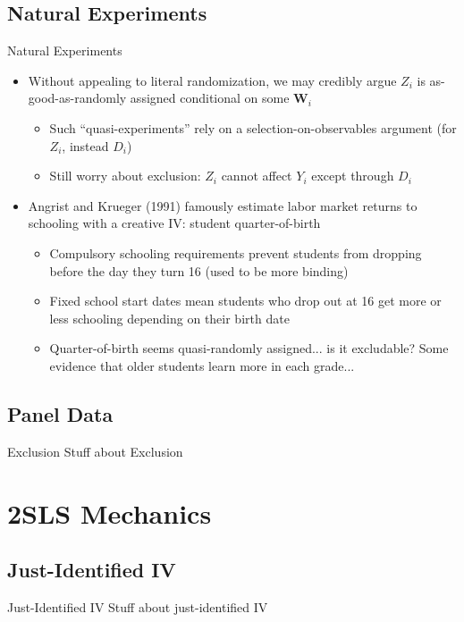 \documentclass{beamer}
\begin{document}
\subsection{Natural Experiments}
\begin{frame}{Natural Experiments}
\begin{itemize}
\item Without appealing to literal randomization, we may credibly argue $Z_i$ is as-good-as-randomly assigned conditional on some $\mathbf{W}_i$\smallskip
\begin{itemize}
\item Such ``quasi-experiments'' rely on a selection-on-observables argument (for $Z_i$, instead $D_i$)
\smallskip
\item Still worry about exclusion: $Z_i$ cannot affect $Y_i$ except through $D_i$
\end{itemize}\pause{}\medskip
\item Angrist and Krueger (1991) famously estimate labor market returns to schooling with a creative IV: student quarter-of-birth\smallskip
\begin{itemize}
\item Compulsory schooling requirements prevent students from dropping before the day they turn 16 (used to be more binding)
\smallskip
\item Fixed school start dates mean students who drop out at 16 get more or less schooling depending on their birth date\pause{}
\smallskip
\item Quarter-of-birth seems quasi-randomly assigned... is it excludable? Some evidence that older students learn more in each grade...
\end{itemize}
\end{itemize}
\end{frame}


\subsection{Panel Data}
\begin{frame}{Exclusion}
Stuff about Exclusion
\end{frame}

\section{2SLS Mechanics}

\subsection{Just-Identified IV}
\begin{frame}{Just-Identified IV}
Stuff about just-identified IV
\end{frame}
\end{document}
